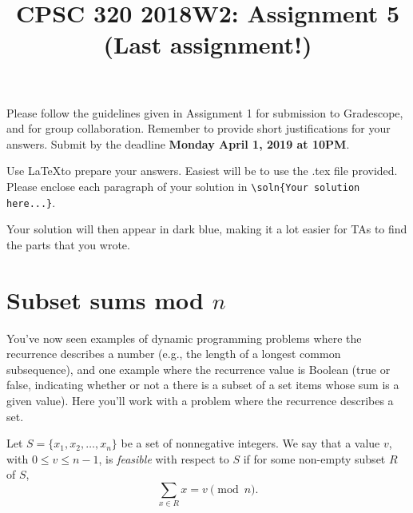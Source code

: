 \documentclass[11pt]{article}
\date{}
\title{CPSC 320 2018W2: Assignment 5 (Last assignment!)}
\def\soln#1{\par\blu{#1}} %
\def\blu#1{{\color{blu}#1}}
\begin{document}
\maketitle
\vspace{-.7in}

Please follow the guidelines given in Assignment 1 for submission to
Gradescope, and for group collaboration. Remember to provide short
justifications for your answers. Submit by the deadline \textbf{Monday 
April 1, 2019 at 10PM}.

Use \LaTeX to prepare your answers. Easiest will be to use the .tex
file provided.  Please enclose each paragraph of your solution in
\verb~\soln{Your solution here...}~.  \soln{Your solution will then appear
in dark blue}, making it a lot easier for TAs to find the parts that
you wrote.

\section{Subset sums mod $n$}
\label{sec-1}
You've now seen examples of dynamic programming problems where the
recurrence describes a number (e.g., the length of a longest common
subsequence), and one example where the recurrence value is Boolean (true or false, indicating
whether or not a there is a subset of a set items whose sum is a given value).
Here you'll work with a problem where the recurrence describes a set.

Let $S = \{x_1, x_2, \ldots, x_n\}$ be a set of nonnegative integers.
We say that a value $v$, with $0 \le v \le n-1$, is \emph{feasible} with respect
to $S$ if for some non-empty subset $R$ of $S$, 
\[ 
\sum_{x \in R} x = v \pmod n.  
\]
\end{document}
